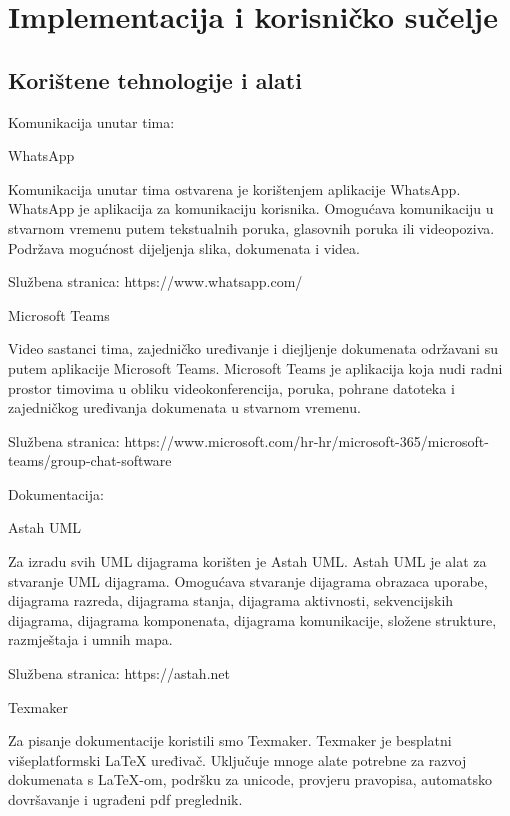 \chapter{Implementacija i korisničko sučelje}
		
		
		\section{Korištene tehnologije i alati}
		
			\textbf{\textit{}}
			
Komunikacija unutar tima:
\vspace{4mm}
	
WhatsApp

Komunikacija unutar tima ostvarena je korištenjem aplikacije WhatsApp. 
WhatsApp je aplikacija za komunikaciju korisnika. Omogućava komunikaciju u stvarnom vremenu putem tekstualnih poruka, glasovnih poruka ili videopoziva. Podržava mogućnost dijeljenja slika, dokumenata i videa.

Službena stranica: https://www.whatsapp.com/
\vspace{3mm}

Microsoft Teams

Video sastanci tima, zajedničko uređivanje i diejljenje dokumenata održavani su putem aplikacije Microsoft Teams. 
Microsoft Teams je aplikacija koja nudi radni prostor timovima u obliku videokonferencija, poruka, pohrane datoteka i zajedničkog uređivanja dokumenata u stvarnom vremenu. 

Službena stranica: https://www.microsoft.com/hr-hr/microsoft-365/microsoft-teams/group-chat-software

\vspace{8mm}
Dokumentacija:
\vspace{4mm}

Astah UML 

Za izradu svih UML dijagrama korišten je Astah UML.
Astah UML je alat za stvaranje UML dijagrama. Omogućava stvaranje  dijagrama obrazaca uporabe, dijagrama razreda, dijagrama stanja, dijagrama aktivnosti, sekvencijskih dijagrama, dijagrama komponenata, dijagrama komunikacije, složene strukture, razmještaja i umnih mapa. 

Službena stranica: https://astah.net
\vspace{3mm}

Texmaker

Za pisanje dokumentacije koristili smo Texmaker.
Texmaker je besplatni višeplatformski LaTeX uređivač. Uključuje mnoge alate potrebne za razvoj dokumenata s LaTeX-om, podršku za unicode, provjeru pravopisa, automatsko dovršavanje i ugrađeni pdf preglednik.

